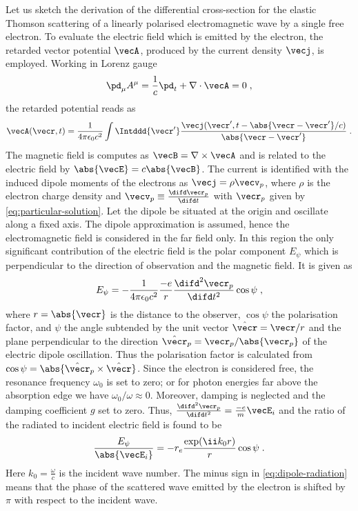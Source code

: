 \documentclass[
twoside,
openright,
titlepage,
numbers=noenddot,
headinclude,
fleqn,
a4paper,
footinclude=true,
cleardoublepage=empty,
abstractoff,
BCOR=5mm,
paper=a4,
fontsize=11pt,
british,ngerman,american,
]{scrreprt}
\begin{document}
Let us sketch the derivation of the differential cross-section for the
elastic Thomson scattering of a linearly polarised electromagnetic
wave by a single free electron.  To evaluate the electric field which
is emitted by the electron, the retarded vector potential $\vecA$,
produced by the current density $\vecj$, is employed.  Working in
Lorenz gauge
\begin{equation}
  \label{eq:lorenz-gauge}
  \pd_\mu A^\mu = \frac{1}{c}\pd_t +\nabla\cdot\vecA =0 \;,
\end{equation}
the retarded potential reads as \cite{Jackson}
\begin{equation}
  \label{eq:retarded-vector-potential}
  \vecA(\vecr,t) = \frac{1}{4\pi\epsilon_0c^2}\int\Intddd{\vecr'}
  \frac{\vecj(\vecr',t-\abs{\vecr-\vecr'}/c)}{\abs{\vecr-\vecr'}} \;.
\end{equation}
The magnetic field is computes as $\vecB=\nabla\times\vecA$ and is
related to the electric field by $\abs{\vecE}=c\abs{\vecB}$.  The
current is identified with the induced dipole moments of the electrons
as $\vecj = \rho \vecv_p$, where $\rho$ is the electron charge density
and $\vecv_p\equiv\frac{\difd\vecr_p}{\difd t}$ with $\vecr_p$ given
by \cref{eq:particular-solution}.  Let the dipole be situated at the
origin and oscillate along a fixed axis.  The dipole approximation is
assumed, hence the electromagnetic field is considered in the far
field only.  In this region the only significant contribution of the
electric field is the polar component $E_\psi$ which is perpendicular
to the direction of observation and the magnetic field.
It is given as
\begin{equation}
  \label{eq:electric-field-polar}
  E_\psi = -\frac{1}{4\pi\epsilon_0c^2} 
  \frac{-e}{r}\frac{\difd^2\vecr_p}{\difd t^2}\cos\psi \;,
\end{equation}
where $r=\abs{\vecr}$ is the distance to the observer, $\cos\psi$ the
polarisation factor, and $\psi$ the angle subtended by the unit vector
$\hat{\vecr}=\vecr/r$ and the plane perpendicular to the direction
$\hat{\vecr}_p=\vecr_p/\abs{\vecr_p}$ of the electric dipole
oscillation.  Thus the polarisation factor is calculated from
$\cos\psi=\abs{\hat{\vecr}_p\times\hat{\vecr}}$.  Since the electron
is considered free, the resonance frequency $\omega_0$ is set to
zero; or for photon energies far above the absorption edge we have
$\omega_0/\omega\approx0$.  Moreover, damping is neglected and 
the damping coefficient $g$ set to zero.  Thus,
$\frac{\difd^2\vecr_p}{\difd t^2}=\frac{-e}{m}\vecE_{i}$ and the ratio
of the radiated to incident electric field is found to be
\cite{Jackson}
\begin{equation}
  \label{eq:dipole-radiation}
  \frac{E_\psi}{\abs{\vecE_i}} = 
  -r_e\frac{\exp(\ii k_0 r)}{r}\cos\psi \;.
\end{equation}
Here $k_0=\frac{\omega}{c}$ is the incident wave number.  The minus
sign in \cref{eq:dipole-radiation} means that the phase of the
scattered wave emitted by the electron is shifted by $\pi$ with
respect to the incident wave.
\end{document}
